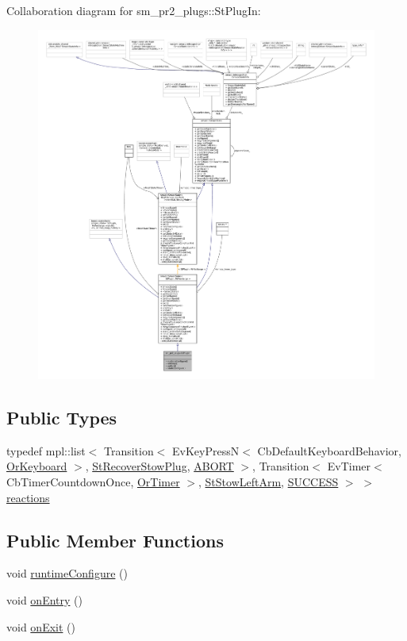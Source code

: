 Collaboration diagram for sm\+\_\+pr2\+\_\+plugs\+:\+:St\+Plug\+In\+:
\nopagebreak
\begin{figure}[H]
\begin{center}
\leavevmode
\includegraphics[width=350pt]{structsm__pr2__plugs_1_1StPlugIn__coll__graph}
\end{center}
\end{figure}
\subsection*{Public Types}
\begin{DoxyCompactItemize}
\item 
typedef mpl\+::list$<$ Transition$<$ Ev\+Key\+PressN$<$ Cb\+Default\+Keyboard\+Behavior, \hyperlink{classsm__pr2__plugs_1_1OrKeyboard}{Or\+Keyboard} $>$, \hyperlink{structsm__pr2__plugs_1_1StRecoverStowPlug}{St\+Recover\+Stow\+Plug}, \hyperlink{classABORT}{A\+B\+O\+RT} $>$, Transition$<$ Ev\+Timer$<$ Cb\+Timer\+Countdown\+Once, \hyperlink{classsm__pr2__plugs_1_1OrTimer}{Or\+Timer} $>$, \hyperlink{structsm__pr2__plugs_1_1StStowLeftArm}{St\+Stow\+Left\+Arm}, \hyperlink{classSUCCESS}{S\+U\+C\+C\+E\+SS} $>$ $>$ \hyperlink{structsm__pr2__plugs_1_1StPlugIn_a8af73855d8085eb54ef4052001a783d4}{reactions}
\end{DoxyCompactItemize}
\subsection*{Public Member Functions}
\begin{DoxyCompactItemize}
\item 
void \hyperlink{structsm__pr2__plugs_1_1StPlugIn_a21411a3a1c4fa85a7bad312cf01b0d9a}{runtime\+Configure} ()
\item 
void \hyperlink{structsm__pr2__plugs_1_1StPlugIn_a8d3fdf50ab08b1692c7bb38a158cf356}{on\+Entry} ()
\item 
void \hyperlink{structsm__pr2__plugs_1_1StPlugIn_a80a329049d6600f26e662fbdfc65a02e}{on\+Exit} ()
\end{DoxyCompactItemize}
